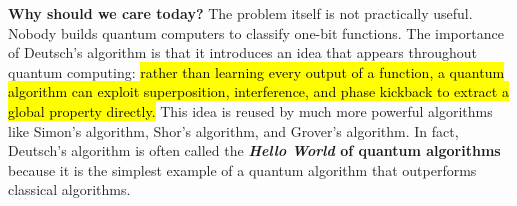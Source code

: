 \highspace
\textcolor{Green3}{ \textbf{Why should we care today?}} The problem itself is not practically useful. Nobody builds quantum computers to classify one-bit functions. The importance of Deutsch's algorithm is that it introduces an idea that appears throughout quantum computing: \hl{rather than learning every output of a function, a quantum algorithm can exploit superposition, interference, and phase kickback to extract a global property directly.} This idea is reused by much more powerful algorithms like Simon's algorithm, Shor's algorithm, and Grover's algorithm. In fact, Deutsch's algorithm is often called the \textbf{\emph{Hello World} of quantum algorithms} because it is the simplest example of a quantum algorithm that outperforms classical algorithms.